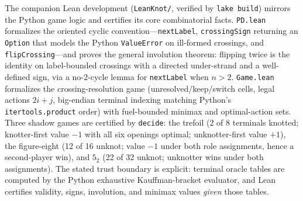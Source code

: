 The companion Lean development (\texttt{LeanKnot/}, verified by
\texttt{lake build}) mirrors the Python game logic and certifies its core
combinatorial facts. \texttt{PD.lean} formalizes the oriented cyclic
convention---\texttt{nextLabel}, \texttt{crossingSign} returning an
\texttt{Option} that models the Python \texttt{ValueError} on ill-formed
crossings, and \texttt{flipCrossing}---and proves the general involution
theorem: flipping twice is the identity on label-bounded crossings with a
directed under-strand and a well-defined sign, via a no-2-cycle lemma for
\texttt{nextLabel} when $n > 2$. \texttt{Game.lean} formalizes the
crossing-resolution game (unresolved/keep/switch cells, legal actions
$2i+j$, big-endian terminal indexing matching Python's
\texttt{itertools.product} order) with fuel-bounded minimax and optimal-action
sets. Three shadow games are certified by \texttt{decide}: the trefoil (2 of 8
terminals knotted; knotter-first value $-1$ with all six openings optimal;
unknotter-first value $+1$), the figure-eight (12 of 16 unknot; value $-1$
under both role assignments, hence a second-player win), and $5_2$ (22 of 32
unknot; unknotter wins under both assignments). The stated trust boundary is
explicit: terminal oracle tables are computed by the Python exhaustive
Kauffman-bracket evaluator, and Lean certifies validity, signs, involution,
and minimax values \emph{given} those tables.
